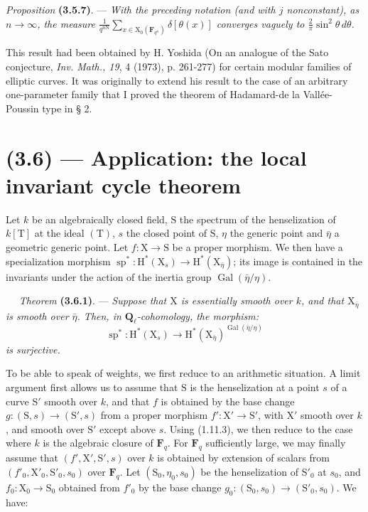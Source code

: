\documentclass[11pt,leqno]{article}
\newcommand{\Page}[1]{\ifvmode\noindent\else\unskip\ \fi{\footnotesize\textcolor{gray}{[p.\,#1]}}\ \ignorespaces}
\begin{document}
\textit{Proposition} \textbf{(3.5.7)}. — \textit{With the preceding notation (and with \(j\) nonconstant), as \(n\to\infty\), the measure \(\displaystyle\frac{1}{q^{n\mathrm N}}\sum_{x\in\mathrm X_0(\mathbf F_{q^n})}\delta[\theta(x)]\) converges vaguely to \(\displaystyle\frac{2}{\pi}\sin^2\theta\,d\theta\).}

This result had been obtained by H. Yoshida (On an analogue of the Sato conjecture, \textit{Inv. Math., 19}, 4 (1973), p. 261-277) for certain modular families of elliptic curves. It was originally to extend his result to the case of an arbitrary one-parameter family that I proved the theorem of Hadamard-de la Vallée-Poussin type in § 2.

\section*{(3.6) — Application: the local invariant cycle theorem}

Let \(k\) be an algebraically closed field, \(\mathrm S\) the spectrum of the henselization of \(k[\mathrm T]\) at the ideal \((\mathrm T)\), \(s\) the closed point of \(\mathrm S\), \(\eta\) the generic point and \(\bar\eta\) a geometric generic point. Let \(f:\mathrm X\to\mathrm S\) be a proper morphism. We then have a specialization morphism \(\operatorname{sp}^*:\mathrm H^*(\mathrm X_s)\to\mathrm H^*(\mathrm X_{\bar\eta})\); its image is contained in the invariants under the action of the inertia group \(\operatorname{Gal}(\bar\eta/\eta)\).

\Page{213}
\textit{Theorem} \textbf{(3.6.1)}. — \textit{Suppose that \(\mathrm X\) is essentially smooth over \(k\), and that \(\mathrm X_{\bar\eta}\) is smooth over \(\bar\eta\). Then, in \(\mathbf Q_\ell\)-cohomology, the morphism:}
\[
\operatorname{sp}^*:\mathrm H^*(\mathrm X_s)\to
\mathrm H^*(\mathrm X_{\bar\eta})^{\operatorname{Gal}(\bar\eta/\eta)}
\]
\textit{is surjective.}

To be able to speak of weights, we first reduce to an arithmetic situation. A limit argument first allows us to assume that \(\mathrm S\) is the henselization at a point \(s\) of a curve \(\mathrm S'\) smooth over \(k\), and that \(f\) is obtained by the base change \(g:(\mathrm S,s)\to(\mathrm S',s)\) from a proper morphism \(f':\mathrm X'\to\mathrm S'\), with \(\mathrm X'\) smooth over \(k\), and smooth over \(\mathrm S'\) except above \(s\). Using (1.11.3), we then reduce to the case where \(k\) is the algebraic closure of \(\mathbf F_q\). For \(\mathbf F_q\) sufficiently large, we may finally assume that \((f',\mathrm X',\mathrm S',s)\) over \(k\) is obtained by extension of scalars from \((f'_0,\mathrm X'_0,\mathrm S'_0,s_0)\) over \(\mathbf F_q\). Let \((\mathrm S_0,\eta_0,s_0)\) be the henselization of \(\mathrm S'_0\) at \(s_0\), and \(f_0:\mathrm X_0\to\mathrm S_0\) obtained from \(f'_0\) by the base change \(g_0:(\mathrm S_0,s_0)\to(\mathrm S'_0,s_0)\). We have:
\end{document}
